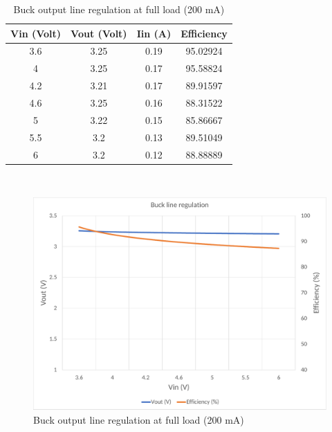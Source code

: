 \begin{table}[H]
\centering
\begin{tabular}{c c c c}
\toprule
Vin (Volt) & Vout (Volt) & Iin (A) & Efficiency \\ \midrule\midrule
3.6        & 3.25        & 0.19    & 95.02924   \\ 
4          & 3.25        & 0.17    & 95.58824   \\ 
4.2        & 3.21        & 0.17    & 89.91597   \\ 
4.6        & 3.25        & 0.16    & 88.31522   \\ 
5          & 3.22        & 0.15    & 85.86667   \\ 
5.5        & 3.2         & 0.13    & 89.51049   \\ 
6          & 3.2         & 0.12    & 88.88889   \\ 
\bottomrule
\end{tabular}
\caption{Buck output line regulation at full load (200 mA)}
\label{table:4}
\end{table}
\\
\begin{figure}[H]
	\centering
	\includegraphics[width=\columnwidth]{IMGS/Buck output line regulation at full load (200mA).pdf}
	\caption{Buck output line regulation at full load (200 mA)}
	\label{fig:arch}
\end{figure}


